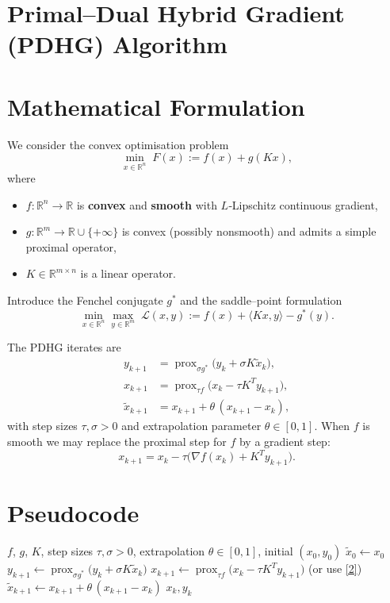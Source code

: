 \documentclass{article}
\newcommand{\prox}{\operatorname{prox}}
\newcommand{\R}{\mathbb{R}}
\begin{document}
\section*{Primal–Dual Hybrid Gradient (PDHG) Algorithm}

\section*{Mathematical Formulation}
We consider the convex optimisation problem
\[
\min_{x\in\R^{n}} \; F(x):=f(x)+g(Kx),
\tag{P}
\]
where  

\begin{itemize}
  \item $f:\R^{n}\!\to\!\R$ is \textbf{convex} and \textbf{smooth} with $L$‑Lipschitz continuous gradient,
  \item $g:\R^{m}\!\to\!\R\cup\{+\infty\}$ is convex (possibly nonsmooth) and admits a simple proximal operator,
  \item $K\in\R^{m\times n}$ is a linear operator.
\end{itemize}
Introduce the Fenchel conjugate $g^{*}$ and the saddle–point formulation
\[
\min_{x\in\R^{n}}\max_{y\in\R^{m}} \; \mathcal{L}(x,y)
:= f(x)+\langle Kx,y\rangle - g^{*}(y).
\tag{S}
\]

The PDHG iterates are
\[
\boxed{
\begin{aligned}
y_{k+1}&=\prox_{\sigma g^{*}}\!\bigl(y_{k}+\sigma K\tilde x_{k}\bigr), \\
x_{k+1}&=\prox_{\tau f}\!\bigl(x_{k}-\tau K^{\!T}y_{k+1}\bigr), \\
\tilde x_{k+1}&=x_{k+1}+\theta\,(x_{k+1}-x_{k}),
\end{aligned}}
\tag{1}
\]
with step sizes $\tau,\sigma>0$ and extrapolation parameter $\theta\in[0,1]$.
When $f$ is smooth we may replace the proximal step for $f$ by a gradient step:
\[
x_{k+1}=x_{k}-\tau\bigl(\nabla f(x_{k})+K^{\!T}y_{k+1}\bigr).
\tag{2}
\]

\section*{Pseudocode}
\begin{algorithm}[H]
\caption{Primal–Dual Hybrid Gradient (PDHG)}
\begin{algorithmic}[1]
\REQUIRE $f$, $g$, $K$, step sizes $\tau,\sigma>0$, extrapolation $\theta\in[0,1]$, initial $(x_{0},y_{0})$
\STATE $\tilde x_{0}\gets x_{0}$
\STATE $y_{k+1}\gets\prox_{\sigma g^{*}}\!\bigl(y_{k}+\sigma K\tilde x_{k}\bigr)$
\STATE $x_{k+1}\gets\prox_{\tau f}\!\bigl(x_{k}-\tau K^{\!T}y_{k+1}\bigr)$ \quad (or use \eqref{2})
\STATE $\tilde x_{k+1}\gets x_{k+1}+\theta\,(x_{k+1}-x_{k})$
\ENDFOR
\RETURN $x_{k},y_{k}$
\end{algorithmic}
\end{algorithm}
\end{document}
